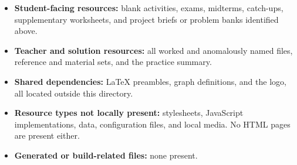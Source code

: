 \begin{itemize}
  \item \textbf{Student-facing resources:} blank activities, exams, midterms, catch-ups, supplementary worksheets, and project briefs or problem banks identified above.
  \item \textbf{Teacher and solution resources:} all worked  and anomalously named  files, reference and material sets, and the practice summary.
  \item \textbf{Shared dependencies:} LaTeX preambles, graph definitions, and the logo, all located outside this directory.
  \item \textbf{Resource types not locally present:} stylesheets, JavaScript implementations, data, configuration files, and local media. No HTML pages are present either.
  \item \textbf{Generated or build-related files:} none present.
\end{itemize}


